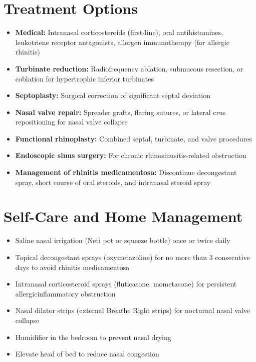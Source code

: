 \section*{Treatment Options}
\begin{itemize}
  \item \textbf{Medical:} Intranasal corticosteroids (first-line), oral antihistamines, leukotriene receptor antagonists, allergen immunotherapy (for allergic rhinitis)
  \item \textbf{Turbinate reduction:} Radiofrequency ablation, submucous resection, or coblation for hypertrophic inferior turbinates
  \item \textbf{Septoplasty:} Surgical correction of significant septal deviation
  \item \textbf{Nasal valve repair:} Spreader grafts, flaring sutures, or lateral crus repositioning for nasal valve collapse
  \item \textbf{Functional rhinoplasty:} Combined septal, turbinate, and valve procedures
  \item \textbf{Endoscopic sinus surgery:} For chronic rhinosinusitis-related obstruction
  \item \textbf{Management of rhinitis medicamentosa:} Discontinue decongestant spray, short course of oral steroids, and intranasal steroid spray
\end{itemize}

\section*{Self-Care and Home Management}
\begin{itemize}
  \item Saline nasal irrigation (Neti pot or squeeze bottle) once or twice daily
  \item Topical decongestant sprays (oxymetazoline) for no more than 3 consecutive days to avoid rhinitis medicamentosa
  \item Intranasal corticosteroid sprays (fluticasone, mometasone) for persistent allergic\/inflammatory obstruction
  \item Nasal dilator strips (external Breathe Right strips) for nocturnal nasal valve collapse
  \item Humidifier in the bedroom to prevent nasal drying
  \item Elevate head of bed to reduce nasal congestion
\end{itemize}

